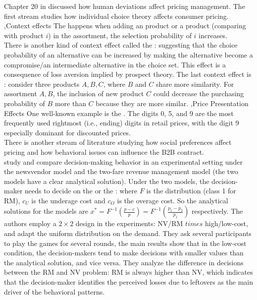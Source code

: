 \documentclass[12pt]{report}
\begin{document}
Chapter 20 in \cite{ozer2012oxford} discussed how human deviations affect pricing management. The first stream studies how individual choice theory affects consumer pricing.
\sep{Context effects}
The  happens when adding an  product or a  product (comparing with product $i$) in the assortment, the selection probability of $i$ increases. \\
There is another kind of context effect called the : suggesting that the choice probability of an alternative can be increased by making the alternative become a compromise/an intermediate alternative in the choice set. 
This effect is a consequence of loss aversion implied by prospect theory.
The last context effect is : consider three products $A,B,C$, where $B$ and $C$ share more similarity. For assortment $A, B$, the inclusion of new product $C$ could decrease the purchasing probability of $B$ more than $C$ because they are more similar.
\sep{Price Presentation Effects}
One well-known example is the . The digits 0, 5, and 9 are the most frequently used rightmost (i.e., ending) digits in retail prices, with the digit 9 especially dominant for discounted prices.\\
There is another stream of literature studying how social preferences affect pricing and how behavioral issues can influence the B2B contract. \\

\cite{Kocabiyikoglu2015} study and compare decision-making behavior in an experimental setting under the newsvendor model and the two-fare revenue management model (the two models have a clear analytical solution). 
Under the two models, the decision-maker needs to decide on the  or the :
where $F$ is the distribution (class 1 for RM), $c_U$ is the underage cost and $c_O$ is the overage cost. 
So the analytical solutions for the models are $x^*=F^{-1}\left(\frac{p-c}p\right)=F^{-1}\left(\frac{p_1-p_2}{p_1}\right)$ respectively. 
The authors employ a $2\times 2$ design in the experiments: NV/RM $times$ high/low-cost, and adapt the uniform distribution on the demand. 
They ask several participants to play the games for several rounds, the main results show that in the low-cost condition, the decision-makers tend to make decisions with smaller values than the analytical solution, and vice versa. 
They analyze the difference in decisions between the RM and NV problem: RM is always higher than NV, which indicates that the decision-maker identifies the perceived losses due to leftovers as the main driver of the behavioral patterns.\\
\end{document}

